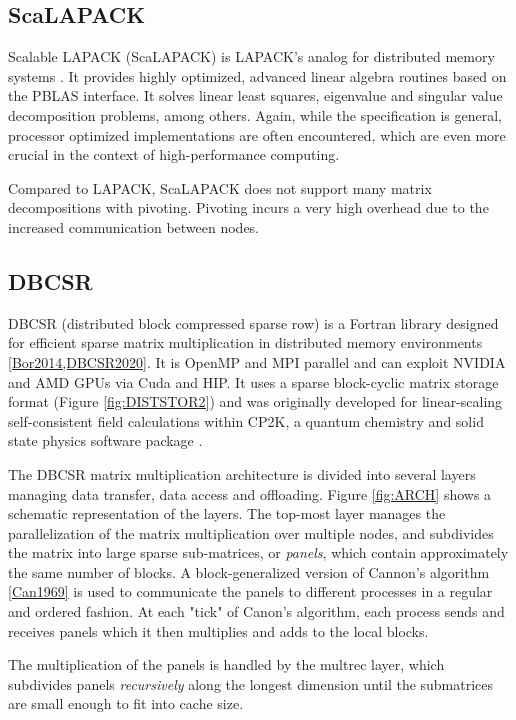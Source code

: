 \subsection{ScaLAPACK}

Scalable LAPACK (ScaLAPACK) is LAPACK's analog for distributed memory systems \cite{Sca2021}. It provides highly optimized, advanced linear algebra routines based on the PBLAS interface.  It solves linear least squares, eigenvalue and singular value decomposition problems, among others. Again, while the specification is general, processor optimized implementations are often encountered, which are even more crucial in the context of high-performance computing. 

Compared to LAPACK, ScaLAPACK does not support many matrix decompositions with pivoting. Pivoting incurs a very high overhead due to the increased communication between nodes.

\subsection{DBCSR}

DBCSR (distributed block compressed sparse row) is a Fortran library designed for efficient sparse matrix multiplication in distributed memory environments \ref{Bor2014,DBCSR2020}. It is OpenMP and MPI parallel and can exploit NVIDIA and AMD GPUs via Cuda and HIP. It uses a sparse block-cyclic matrix storage format (Figure \ref{fig:DISTSTOR2}) and was originally developed for linear-scaling self-consistent field calculations within CP2K, a quantum chemistry and solid state physics software package \cite{Hut2014,Sch2016}. 

The DBCSR matrix multiplication architecture is divided into several layers managing data transfer, data access and offloading. Figure \ref{fig:ARCH} shows a schematic representation of the layers. The top-most layer manages the parallelization of the matrix multiplication over multiple nodes, and subdivides the matrix into large sparse sub-matrices, or \emph{panels}, which contain approximately the same number of blocks. A block-generalized version of Cannon's algorithm \ref{Can1969} is used to communicate the panels to different processes in a regular and ordered fashion. At each "tick" of Canon's algorithm, each process  sends and receives panels which it then multiplies and adds to the local blocks. 

The multiplication of the panels is handled by the multrec layer, which subdivides panels \emph{recursively} along the longest dimension until the submatrices are small enough to fit into cache size.

